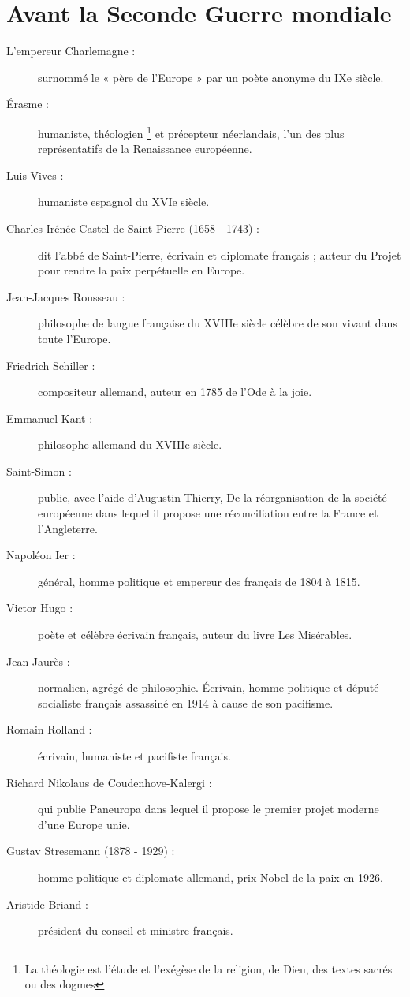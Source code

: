 \documentclass{report}%
\begin{document}
\section{Avant la Seconde Guerre mondiale}
	\begin{description}
		\item [L'empereur Charlemagne :] surnommé le « père de l'Europe » par un poète anonyme du IXe siècle.
		\item [Érasme :] humaniste, théologien \footnote{La théologie est l'étude et l'exégèse de la religion, de Dieu, des textes sacrés ou des dogmes} et précepteur néerlandais, l'un des plus représentatifs de la Renaissance européenne.
		\item [Luis Vives :] humaniste espagnol du XVIe siècle.
		\item [Charles-Irénée Castel de Saint-Pierre (1658 - 1743) :] dit l'abbé de Saint-Pierre, écrivain et diplomate français ; auteur du Projet pour rendre la paix perpétuelle en Europe.
		\item [Jean-Jacques Rousseau :] philosophe de langue française du XVIIIe siècle célèbre de son vivant dans toute l'Europe.
		\item [Friedrich Schiller :] compositeur allemand, auteur en 1785 de l'Ode à la joie.
		\item [Emmanuel Kant :] philosophe allemand du XVIIIe siècle.
		\item [Saint-Simon :] publie, avec l'aide d'Augustin Thierry, De la réorganisation de la société européenne dans lequel il propose une réconciliation entre la France et l'Angleterre.
		\item [Napoléon Ier :] général, homme politique et empereur des français de 1804 à 1815.
		\item [Victor Hugo :] poète et célèbre écrivain français, auteur du livre Les Misérables.
		\item [Jean Jaurès :] normalien, agrégé de philosophie. Écrivain, homme politique et député socialiste français assassiné en 1914 à cause de son pacifisme.
		\item [Romain Rolland :] écrivain, humaniste et pacifiste français.
		\item [Richard Nikolaus de Coudenhove-Kalergi :] qui publie Paneuropa dans lequel il propose le premier projet moderne d'une Europe unie.
		\item [Gustav Stresemann (1878 - 1929) :] homme politique et diplomate allemand, prix Nobel de la paix en 1926.
		\item [Aristide Briand :] président du conseil et ministre français.
	\end{description}
\end{document}
